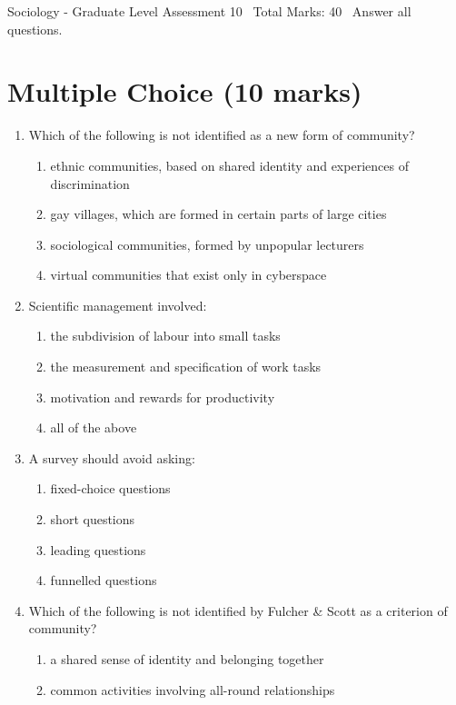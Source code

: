 \documentclass[12pt]{article}
\begin{document}
\begin{center}
Sociology - Graduate Level Assessment 10 \
Total Marks: 40 \
Answer all questions.
\end{center}

\section*{Multiple Choice (10 marks)}
\begin{enumerate}[label=\arabic*.]
\item Which of the following is not identified as a new form of community?
\begin{enumerate}[label=(\alph*)]
    \item ethnic communities, based on shared identity and experiences of discrimination
    \item gay villages, which are formed in certain parts of large cities
    \item sociological communities, formed by unpopular lecturers
    \item virtual communities that exist only in cyberspace
\end{enumerate}
\item Scientific management involved:
\begin{enumerate}[label=(\alph*)]
    \item the subdivision of labour into small tasks
    \item the measurement and specification of work tasks
    \item motivation and rewards for productivity
    \item all of the above
\end{enumerate}
\item A survey should avoid asking:
\begin{enumerate}[label=(\alph*)]
    \item fixed-choice questions
    \item short questions
    \item leading questions
    \item funnelled questions
\end{enumerate}
\item Which of the following is not identified by Fulcher \& Scott as a criterion of community?
\begin{enumerate}[label=(\alph*)]
    \item a shared sense of identity and belonging together
    \item common activities involving all-round relationships

\end{enumerate}
\end{enumerate}
\end{document}
